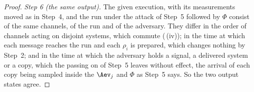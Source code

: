 \begin{proof}
\emph{Step 6 (the same output).} The given execution, with its measurements
moved as in Step~4, and the run under the attack of Step~5 followed by $\Phi$
consist of the same channels, of the run and of the adversary. They differ in
the order of channels acting on disjoint systems, which commute
(\,(iv)); in the time at which
each message reaches the run and each $\rho_i$ is prepared, which changes
nothing by Step~2; and in the time at which the adversary holds a signal, a
delivered system or a copy, which the passing on of Step~5 leaves without
effect, the arrival of each copy being sampled inside the $\Aev_j$ and
$\Phi$ as Step~5 says. So the two output states agree.
\end{proof}
